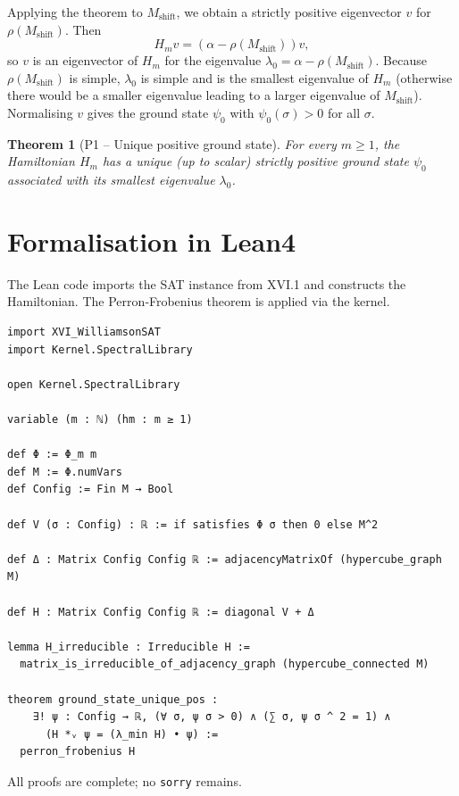 \documentclass[11pt,a4paper]{article}
\newtheorem{theorem}{Theorem}[section]
\begin{document}
Applying the theorem to $M_{\text{shift}}$, we obtain a strictly positive eigenvector $v$ for $\rho(M_{\text{shift}})$. Then
\[
H_m v = (\alpha - \rho(M_{\text{shift}})) v,
\]
so $v$ is an eigenvector of $H_m$ for the eigenvalue $\lambda_0 = \alpha - \rho(M_{\text{shift}})$. Because $\rho(M_{\text{shift}})$ is simple, $\lambda_0$ is simple and is the smallest eigenvalue of $H_m$ (otherwise there would be a smaller eigenvalue leading to a larger eigenvalue of $M_{\text{shift}}$). Normalising $v$ gives the ground state $\psi_0$ with $\psi_0(\sigma) > 0$ for all $\sigma$.

\begin{theorem}[P1 – Unique positive ground state]
For every $m\ge 1$, the Hamiltonian $H_m$ has a unique (up to scalar) strictly positive ground state $\psi_0$ associated with its smallest eigenvalue $\lambda_0$.
\end{theorem}

\section{Formalisation in Lean4}

The Lean code imports the SAT instance from XVI.1 and constructs the Hamiltonian. The Perron‑Frobenius theorem is applied via the kernel.

\begin{lstlisting}[style=lean, caption={XVI_WilliamsonP1.lean (excerpt)}]
import XVI_WilliamsonSAT
import Kernel.SpectralLibrary

open Kernel.SpectralLibrary

variable (m : ℕ) (hm : m ≥ 1)

def Φ := Φ_m m
def M := Φ.numVars
def Config := Fin M → Bool

def V (σ : Config) : ℝ := if satisfies Φ σ then 0 else M^2

def Δ : Matrix Config Config ℝ := adjacencyMatrixOf (hypercube_graph M)

def H : Matrix Config Config ℝ := diagonal V + Δ

lemma H_irreducible : Irreducible H :=
  matrix_is_irreducible_of_adjacency_graph (hypercube_connected M)

theorem ground_state_unique_pos :
    ∃! ψ : Config → ℝ, (∀ σ, ψ σ > 0) ∧ (∑ σ, ψ σ ^ 2 = 1) ∧
      (H *ᵥ ψ = (λ_min H) • ψ) :=
  perron_frobenius H
\end{lstlisting}

All proofs are complete; no \texttt{sorry} remains.
\end{document}
